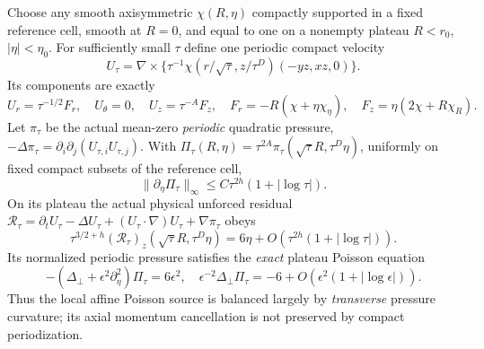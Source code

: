 Choose any smooth axisymmetric $\chi(R,\eta)$ compactly supported in a fixed reference cell, smooth at $R=0$, and equal to one on a nonempty plateau $R<r_0$, $|\eta|<\eta_0$. For sufficiently small $\tau$ define one periodic compact velocity
\[
 U_\tau=\nabla\times\{\tau^{-1}\chi(r/\sqrt\tau,z/\tau^D)(-yz,xz,0)\}.
\]
Its components are exactly
\[
 U_r=\tau^{-1/2}F_r,\quad U_\theta=0,\quad U_z=\tau^{-A}F_z,\quad
 F_r=-R(\chi+\eta\chi_\eta),\quad F_z=\eta(2\chi+R\chi_R).
\]
Let $\pi_\tau$ be the actual mean-zero \emph{periodic} quadratic pressure, $-\Delta\pi_\tau=\partial_i\partial_j(U_{\tau,i}U_{\tau,j})$. With
$\Pi_\tau(R,\eta)=\tau^{2A}\pi_\tau(\sqrt\tau R,\tau^D\eta)$, uniformly on fixed compact subsets of the reference cell,
\begin{equation}\label{eq:AF-axial}
 \boxed{\|\partial_\eta\Pi_\tau\|_\infty
 \le C\tau^{2h}(1+|\log\tau|).}
\end{equation}
On its plateau the actual physical unforced residual
$\mathcal R_\tau=\partial_tU_\tau-\Delta U_\tau+(U_\tau\cdot\nabla)U_\tau+\nabla\pi_\tau$ obeys
\begin{equation}\label{eq:AF-residual}
\boxed{\tau^{3/2+h}(\mathcal R_\tau)_z(\sqrt\tau R,\tau^D\eta)
=6\eta+O(\tau^{2h}(1+|\log\tau|)).}
\end{equation}
Its normalized periodic pressure satisfies the \emph{exact} plateau Poisson equation
\[
 -(\Delta_\perp+\epsilon^2\partial_\eta^2)\Pi_\tau=6\epsilon^2,
 \quad \epsilon^{-2}\Delta_\perp\Pi_\tau=-6+O(\epsilon^2(1+|\log\epsilon|)).
\]
Thus the local affine Poisson source is balanced largely by \emph{transverse} pressure curvature; its axial momentum cancellation is not preserved by compact periodization.
